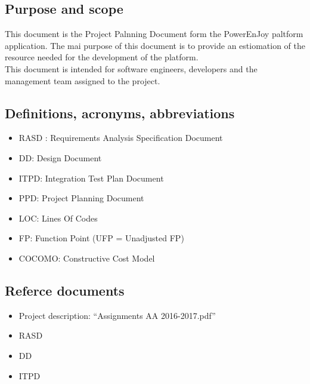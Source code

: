 \subsection{Purpose and scope}
This document is the Project Palnning Document form the PowerEnJoy paltform application. The mai purpose of this document is to provide an estiomation of the resource needed for the development of the platform.\\
This document is intended for software engineers, developers and the management team assigned to the project.\\

\subsection{Definitions, acronyms, abbreviations}
\begin{itemize}
		\item RASD : Requirements Analysis Specification Document
	 	\item DD: Design Document
	 	\item ITPD: Integration Test Plan Document
	 	\item PPD: Project Planning Document
		\item LOC: Lines Of Codes
		\item FP: Function Point (UFP = Unadjusted FP)
		\item COCOMO: Constructive Cost Model 
\end{itemize}

\subsection{Referce documents}
\begin{itemize}
		\item Project description: “Assignments AA 2016-2017.pdf”
	 	\item RASD
	 	\item DD
	 	\item ITPD
\end{itemize}
